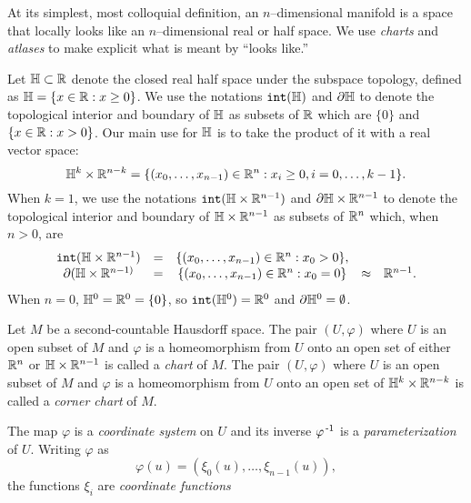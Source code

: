 At its simplest, most colloquial definition, an $n$--dimensional manifold is a space that locally looks like an $n$--dimensional real or half space.
We use \emph{charts} and \emph{atlases} to make explicit what is meant by ``looks like.''

\begin{defn}[Coordinates]
	\label{def:coordinates}
	Let $\mathbb{H}\subset\mathbb{R}$ denote the closed real half space under the subspace topology, defined as $\mathbb{H}=\{x\in\mathbb{R} : x\geq 0\}$.
	We use the notations $\mathtt{int}(\mathbb{H})$ and $\partial \mathbb{H}$ to denote the topological interior and boundary of $\mathbb{H}$ as subsets of $\mathbb{R}$ which are $\{0\}$ and $\{x\in\mathbb{R}:x>0\}$.
	Our main use for $\mathbb{H}$ is to take the product of it with a real vector space:
	\[
		\mathbb{H}^k\times\mathbb{R}^{n-k}=\{(x_0,\dots,x_{n-1})\in\mathbb{R}^n : x_i\geq 0, i=0,\dots,k-1\}.
	\]
	When $k=1$, we use the notations $\mathtt{int}(\mathbb{H}\times\mathbb{R}^{n-1})$ and $\partial \mathbb{H}\times\mathbb{R}^{n-1}$ to denote the topological interior and boundary of $\mathbb{H}\times\mathbb{R}^{n-1}$ as subsets of $\mathbb{R}^n$ which, when $n>0$, are
	\[
		\begin{array}{ccccc}
			\mathtt{int}(\mathbb{H}\times\mathbb{R}^{n-1}) & = & \{(x_0,\dots,x_{n-1})\in\mathbb{R}^n : x_0 > 0\}, & &\\
			\partial (\mathbb{H}\times\mathbb{R}^{n-1)}	& = & \{(x_0,\dots,x_{n-1})\in\mathbb{R}^n : x_0 = 0\} & \approx & \mathbb{R}^{n-1}.
		\end{array}
	\]
	When $n=0$, $\mathbb{H}^0 = \mathbb{R}^0 = \{0\}$, so $\mathtt{int}(\mathbb{H}^0)=\mathbb{R}^0$ and $\partial\mathbb{H}^0=\emptyset$.

	Let $M$ be a second-countable Hausdorff space.
	The pair $(U,\varphi)$ where $U$ is an open subset of $M$ and $\varphi$ is a homeomorphism from $U$ onto an open set of either $\mathbb{R}^n$ or $\mathbb{H}\times\mathbb{R}^{n-1}$ is called a \emph{chart} of $M$.
	The pair $(U,\varphi)$ where $U$ is an open subset of $M$ and $\varphi$ is a homeomorphism from $U$ onto an open set of $\mathbb{H}^k\times\mathbb{R}^{n-k}$ is called a \emph{corner chart} of $M$.
	
	The map $\varphi$ is a \emph{coordinate system} on $U$ and its inverse $\varphi^{\,\text{-}1}$ is a \emph{parameterization} of $U$.
	Writing $\varphi$ as
	\[
		\varphi(u) = (\xi_0(u),\dots,\xi_{n-1}(u)),
	\]
	the functions $\xi_i$ are \emph{coordinate functions}
\end{defn}

